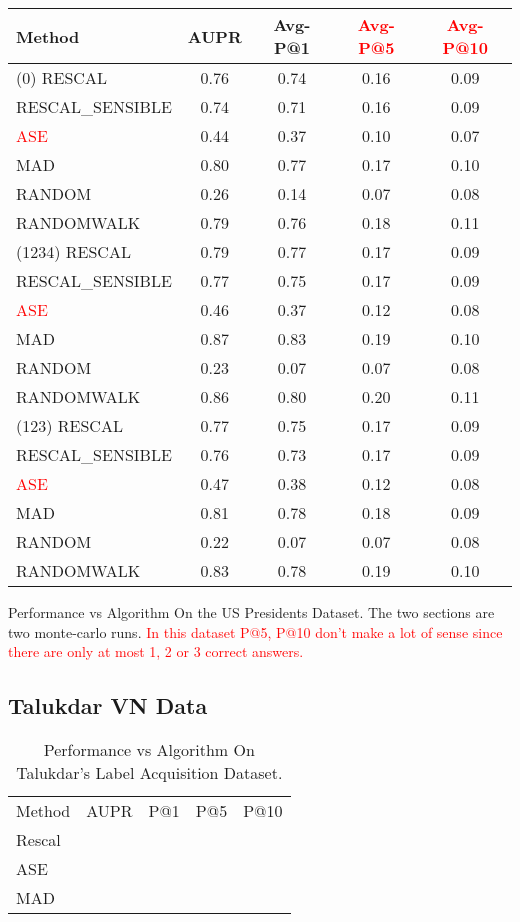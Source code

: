 \documentclass{tufte-handout}
\newcommand{\alert}[1]{\textcolor{red}{#1}}
\begin{document}
\begin{margintable}[-3in]
  \centering
  \begin{tabular}{l c c c c}
    Method & AUPR & Avg-P@1  & \alert{Avg-P@5} & \alert{Avg-P@10} \\\toprule
    (0) RESCAL &  0.76 & 0.74 & 0.16 & 0.09 \\
    RESCAL\_SENSIBLE &  0.74 & 0.71 & 0.16 & 0.09 \\
    \alert{ASE} &  0.44 & 0.37 & 0.10 & 0.07 \\
    MAD &  0.80 & 0.77 & 0.17 & 0.10 \\
    RANDOM &  0.26 & 0.14 & 0.07 & 0.08 \\
    RANDOMWALK &  0.79 & 0.76 & 0.18 & 0.11 \\\midrule
    (1234) RESCAL &  0.79 & 0.77 & 0.17 & 0.09 \\
    RESCAL\_SENSIBLE &  0.77 & 0.75 & 0.17 & 0.09 \\
    \alert{ASE} &  0.46 & 0.37 & 0.12 & 0.08 \\
    MAD &  0.87 & 0.83 & 0.19 & 0.10 \\
    RANDOM &  0.23 & 0.07 & 0.07 & 0.08 \\
    RANDOMWALK &  0.86 & 0.80 & 0.20 & 0.11 \\\midrule
    (123) RESCAL &  0.77 & 0.75 & 0.17 & 0.09 \\
    RESCAL\_SENSIBLE &  0.76 & 0.73 & 0.17 & 0.09 \\
    \alert{ASE} &  0.47 & 0.38 & 0.12 & 0.08 \\
    MAD &  0.81 & 0.78 & 0.18 & 0.09 \\
    RANDOM &  0.22 & 0.07 & 0.07 & 0.08 \\
    RANDOMWALK &  0.83 & 0.78 & 0.19 & 0.10 \\
  \end{tabular}
  \caption{Performance vs Algorithm On the US Presidents Dataset. The two sections are two monte-carlo runs.
    \alert{In this dataset P@5, P@10 don't make a lot of sense since there are only at most 1, 2 or 3 correct answers.}}
  \label{tab:perf-vs-algo-on-us-president}
\end{margintable}

\pagebreak
\subsection{Talukdar VN Data}
\label{sec:talukdar-vn-data}
\begin{table}[htbp]
  \centering
  \begin{tabular}{l c c c c}
    Method & AUPR & P@1 & P@5 & P@10 \\
    Rescal & \\
    ASE    & \\
    MAD    & \\
  \end{tabular}
  \caption{Performance vs Algorithm On Talukdar's Label Acquisition Dataset.}
  \label{tab:perf-vs-algo-on-label_acquisition}
\end{table}
\end{document}
